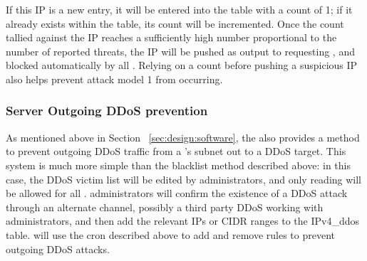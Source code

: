 If this IP is a new entry, it will be entered into the table with a count of 1; if it already exists within the table, its count will be incremented. Once the count tallied against the IP reaches a sufficiently high number proportional to the number of reported threats, the IP will be pushed as output to requesting \nodenames, and blocked automatically by all \nodenames. Relying on a count before pushing a suspicious IP also helps prevent attack model 1 from occurring. 

\subsubsection{Server Outgoing DDoS prevention}
\label{sec:design:serverddos}

As mentioned above in Section ~\ref{sec:design:software}, the \servname also provides a method to prevent outgoing DDoS traffic from a \nodename's subnet out to a DDoS target. This system is much more simple than the blacklist method described above: in this case, the DDoS victim list will be edited by \sysname administrators, and only reading will be allowed for all \nodenames. \sysname administrators will confirm the existence of a DDoS attack through an alternate channel, possibly a third party DDoS \cite{DDoSPreventionTools} working with \sysname administrators, and then add the relevant IPs or CIDR ranges to the IPv4_ddos table. \nodenames will use the cron described above to add and remove rules to prevent outgoing DDoS attacks.